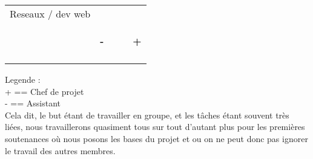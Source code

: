 \documentclass[12pt]{report}
\begin{document}
\begin{center}
\begin{tabular}{|p{2 cm}||p{2.5cm}|p{2.5cm}|p{2.5cm}|p{2.5cm}|}
                \\ & & & &
                 \\
                \hline Reseaux / dev web
                 & & & &
                \\
                & \begin{center}
                 \textbf{\Huge-}
                \end{center}
                 & & & \begin{center}
                     \textbf{\Huge+}
                \end{center}
                \\
                    & & & & 
                \\
            \hline
            \end{tabular}
        \end{center}
            Legende :
            \\+ == Chef de projet
            \\- == Assistant
            \\
            Cela dit, le but étant de travailler en groupe, et les tâches
            étant souvent très liées, nous travaillerons quasiment tous sur
            tout d'autant plus pour les premières soutenances où nous posons
            les bases du projet et ou on ne peut donc pas ignorer le travail
            des autres membres.
\end{document}
